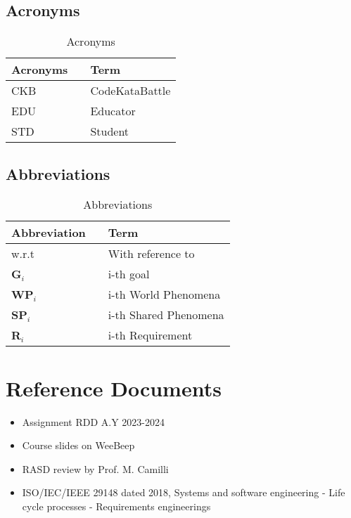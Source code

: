 \subsection{Acronyms}
\begin{table}[H]
    \centering
    \renewcommand{\arraystretch}{1.5} 
    \begin{tabular}{l l p{11cm}}
    \hline
        \textbf{Acronyms}   & & \textbf{Term} \\                                                                                                
    \hline
        CKB                 & & CodeKataBattle \\                                                                                                
        EDU                 & & Educator \\ 
        STD                 & & Student \\ 
    \hline
    \end{tabular}
    \caption{Acronyms}
\end{table}

\subsection{Abbreviations}
\begin{table}[H]
    \centering
    \renewcommand{\arraystretch}{1.5} 
    \begin{tabular}{l l p{10.5cm}}
    \hline
        \textbf{Abbreviation}   & & \textbf{Term} \\                                                                                                
    \hline
        w.r.t                   & & With reference to \\                                                                                                
        \textbf{G}\(_i\)        & & i-th goal \\ 
        \textbf{WP}\(_i\)       & & i-th World Phenomena \\ 
        \textbf{SP}\(_i\)       & & i-th Shared Phenomena \\ 
        \textbf{R}\(_i\)        & & i-th Requirement \\ 
    \hline
    \end{tabular}
    \caption{Abbreviations}
\end{table}

\section{Reference Documents}
\begin{itemize}
    \item Assignment RDD A.Y 2023-2024
    \item Course slides on WeeBeep
    \item RASD review by Prof. M. Camilli
    \item ISO/IEC/IEEE 29148 dated 2018, Systems and software engineering - Life cycle processes - Requirements engineerings
\end{itemize}

